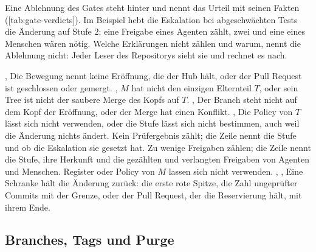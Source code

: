 Eine Ablehnung des Gates steht hinter  und nennt das Urteil mit seinen Fakten
([tab:gate-verdicts]).
Im Beispiel hebt die Eskalation bei abgeschwächten Tests die Änderung auf Stufe 2; eine Freigabe
eines Agenten zählt, zwei und eine eines Menschen wären nötig.
Welche Erklärungen nicht zählen und warum, nennt die Ablehnung nicht: Jeder Leser des Repositorys
sieht sie und rechnet es nach.

\startplacetable[title={Die Urteile des Gates auf dem Hub hinter \type{gate}},
reference=tab:gate-verdicts]
\startxtable[frame=off,option=stretch]
\startxrow[topframe=on,bottomframe=on]
 \stopxcell
{} \stopxcell
\stopxrow
\startxrow
\startxcell {},  \stopxcell
\startxcell Die Bewegung nennt keine Eröffnung, die der Hub hält, oder der Pull Request ist
geschlossen oder gemergt. \stopxcell
\stopxrow
\startxrow
\startxcell {},  \stopxcell
\startxcell $M$ hat nicht den einzigen Elternteil $T$, oder sein Tree ist nicht der saubere
Merge des Kopfs auf $T$. \stopxcell
\stopxrow
\startxrow
\startxcell {},  \stopxcell
\startxcell Der Branch steht nicht auf dem Kopf der Eröffnung, oder der Merge hat einen
Konflikt. \stopxcell
\stopxrow
\startxrow
\startxcell {},  \stopxcell
\startxcell Die Policy von $T$ lässt sich nicht verwenden, oder die Stufe lässt sich nicht
bestimmen, auch weil die Änderung nichts ändert. \stopxcell
\stopxrow
\startxrow
\startxcell {} \stopxcell
\startxcell Kein Prüfergebnis zählt; die Zeile nennt die Stufe und ob die Eskalation sie gesetzt
hat. \stopxcell
\stopxrow
\startxrow
\startxcell {} \stopxcell
\startxcell Zu wenige Freigaben zählen; die Zeile nennt die Stufe, ihre Herkunft und die
gezählten und verlangten Freigaben von Agenten und Menschen. \stopxcell
\stopxrow
\startxrow
\startxcell {} \stopxcell
\startxcell Register oder Policy von $M$ lassen sich nicht verwenden. \stopxcell
\stopxrow
\startxrow[bottomframe=on]
\startxcell {}, ,  \stopxcell
\startxcell Eine Schranke hält die Änderung zurück: die erste rote Spitze, die Zahl ungeprüfter
Commits mit der Grenze, oder der Pull Request, der die Reservierung hält, mit ihrem Ende.
\stopxcell
\stopxrow
\stopxtable
\stopplacetable

\subsection{Branches, Tags und Purge}

